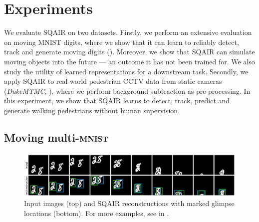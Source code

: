 \section{Experiments}
\label{sec:experiments}

We evaluate \gls{SQAIR} on two datasets.
Firstly, we perform an extensive evaluation on moving \gls{MNIST} digits, where we show that it can learn to reliably detect, track and generate moving digits (). Moreover, we show that \gls{SQAIR} can simulate moving objects into the future --- an outcome it has not been trained for. 
We also study the utility of learned representations for a downstream task.
Secondly, we apply \gls{SQAIR} to real-world pedestrian CCTV data from static cameras (\textit{DukeMTMC}, \cite{ristani2016performance}), where we perform background subtraction as pre-processing. In this experiment, we show that \gls{SQAIR} learns to detect, track, predict and generate walking pedestrians without human supervision.

\subsection{Moving multi-\textsc{mnist}}
\label{sec:expr_mnist}

\begin{figure}
    \centering
    \includegraphics[width=\linewidth]{figures/SQAIR/mnist_rec/000106}
    \caption{Input images (top) and \gls{SQAIR} reconstructions with marked glimpse locations (bottom). For more examples, see  in .}
    \label{fig:mnist_recs}
\end{figure}

